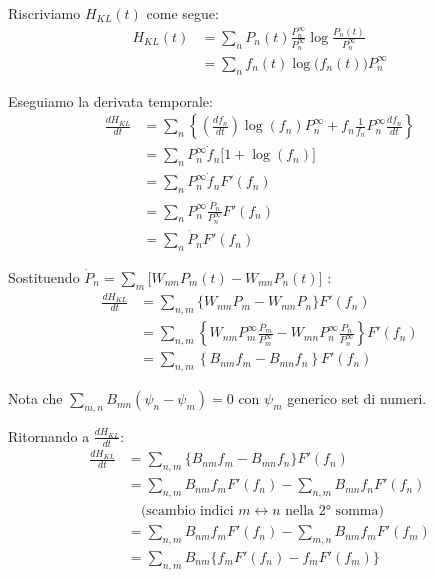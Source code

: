 Riscriviamo $H_{KL}(t)$ come segue:
\begin{align*}
H_{KL}(t) &= \sum_n P_n(t) \frac{P_n^\infty}{P_n^\infty} \log \frac{P_n(t)}{P_n^\infty} \nonumber \\
&= \sum_n f_n(t) \log \biggl(f_n(t) \biggr)P_n^\infty
\end{align*}

Eseguiamo la derivata temporale:
\begin{align*}
\frac{dH_{KL}}{dt} &= \sum_n \left\{ \left( \frac{df_n}{dt} \right) \log(f_n) P_n^\infty + f_n \frac{1}{f_n} P_n^\infty \frac{df_n}{dt} \right\} \nonumber \\
&= \sum_n P_n^\infty \dot{f}_n \biggl[1 + \log (f_n) \biggr] \nonumber \\
&= \sum_n P_n^\infty \dot{f}_n F'(f_n) \nonumber \\ &= \sum_n P_n^\infty \frac{\dot{P}_n}{P_n^\infty} F'(f_n) \nonumber \\
&= \sum_n \dot{P}_n F'(f_n)
\end{align*}

Sostituendo $\dot{P}_n = \sum_m \biggl[W_{nm}P_m(t) - W_{mn}P_n(t)\biggr]$ :
\begin{align*}
\frac{dH_{KL}}{dt} &= \sum_{n,m} \{W_{nm}P_{m} - W_{mn}P_{n}\}F'(f_{n}) \\
&= \sum_{n,m} \left\{ W_{nm}P_{m}^{\infty}\frac{P_{m}}{P_{m}^{\infty}} - W_{mn}P_{n}^{\infty}\frac{P_{n}}{P_{n}^{\infty}} \right\}F'(f_{n}) \\
&= \sum_{n,m} \left\{ B_{nm} f_m - B_{mn} f_n \right\}F'(f_{n})
\end{align*}

\begin{tcolorbox}[
    colback=colorD!5,      
    colframe=colorD,       
    title={Nota},
    fonttitle=\bfseries\sffamily,
    arc=3mm,               
    boxrule=1.2pt,         
    halign title=flush left
]
Nota che $\sum_{m,n} B_{mn} (\psi_n - \psi_m) = 0$ con $\psi_m$ generico set di numeri.
\end{tcolorbox}

Ritornando a $\frac{dH_{KL}}{dt}$:
\begin{align*}
\frac{dH_{KL}}{dt} &= \sum_{n,m} \{B_{nm}f_m - B_{mn}f_n \} F'(f_n) \\
&= \sum_{n,m} B_{nm} f_m F'(f_n) - \sum_{n,m} B_{mn} f_n F'(f_n) \\
&\quad \text{(scambio indici } m \leftrightarrow n \text{ nella 2° somma)}\\ 
&= \sum_{n,m} B_{nm} f_m F'(f_n) - \sum_{m,n} B_{nm} f_m F'(f_m) \\
&= \sum_{n,m} B_{nm} \{ f_m F'(f_n) - f_m F'(f_m) \}
\end{align*}

